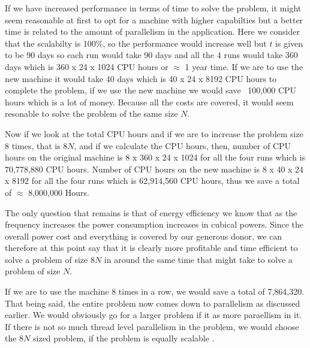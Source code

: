 \documentclass[fleqn,letterpaper,12pt]{report}
\begin{document}
If we have increased performance in terms of time to solve the problem, it might seem reasonable at first to opt for a machine with higher capabilties but a better time is related to the amount of parallelism in the application. Here we consider that the scalabilty is 100\%, so the performance would increase well but $t$ is given to be 90 days so each run  would take 90 days and all the 4 runs would take 360 days which is 360 x 24 x 1024 CPU hours or $\approx$ 1 year time. If we are to use the new machine it would take 40 days which is 40 x 24 x 8192 CPU hours to complete the problem, if we use the new machine we would save ~100,000 CPU hours which is a lot of money.  Because all the costs are covered, it would seem resonable to solve the problem of the same size $N$. 

Now if we look at the total CPU hours and if we are to increase the problem size 8 times, that is $8N$, and if we calculate the CPU hours, then, number of CPU hours on the original machine is 8 x 360 x 24 x 1024 for all the four runs which is 70,778,880 CPU hours. Number of CPU hours on the new machine is 8 x 40 x 24 x 8192 for all the four runs which is 62,914,560 CPU hours, thus we save a total of $\approx$ 8,000,000 Hours.

The only question that remains is that of energy efficiency we know that as the frequency increases the power consumption increases in cubical powers. Since the overall power cost and everything is covered by our generous donor, we can therefore at this point say that it is clearly more profitable and time efficient to solve a problem of size $8N$ in around the same time that might take to solve a problem of size $N$. 
%
\begin{table}[h!]
\centering
\caption{Comparison in terms of CPU hours for all the four runs}
\label{my-label}
\end{table}
%
If we are to use the machine 8 times in a row, we would save a total of 7,864,320. That being said, the entire problem now comes down to parallelism as discussed earlier. We would obviously go for a larger problem if it as more paraellism in it. If there is not so much thread level parallelism in the problem, we would choose the $8N$ sized problem, if the problem is equally scalable \cite{PK}. 
\end{document}
